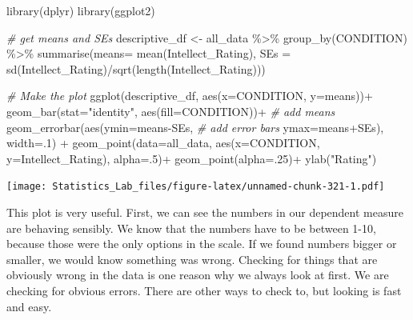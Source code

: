 \documentclass[
]{book}
\newenvironment{Shaded}{\begin{snugshade}}{\end{snugshade}}
\newcommand{\AttributeTok}[1]{\textcolor[rgb]{0.77,0.63,0.00}{#1}}
\newcommand{\CommentTok}[1]{\textcolor[rgb]{0.56,0.35,0.01}{\textit{#1}}}
\newcommand{\DecValTok}[1]{\textcolor[rgb]{0.00,0.00,0.81}{#1}}
\newcommand{\FunctionTok}[1]{\textcolor[rgb]{0.00,0.00,0.00}{#1}}
\newcommand{\NormalTok}[1]{#1}
\newcommand{\OtherTok}[1]{\textcolor[rgb]{0.56,0.35,0.01}{#1}}
\newcommand{\SpecialCharTok}[1]{\textcolor[rgb]{0.00,0.00,0.00}{#1}}
\newcommand{\StringTok}[1]{\textcolor[rgb]{0.31,0.60,0.02}{#1}}
\begin{document}
\begin{Shaded}
\begin{Highlighting}[]
\FunctionTok{library}\NormalTok{(dplyr)}
\FunctionTok{library}\NormalTok{(ggplot2)}

\CommentTok{\# get means and SEs}
\NormalTok{descriptive\_df }\OtherTok{\textless{}{-}}\NormalTok{ all\_data }\SpecialCharTok{\%\textgreater{}\%} 
                    \FunctionTok{group\_by}\NormalTok{(CONDITION) }\SpecialCharTok{\%\textgreater{}\%} 
                    \FunctionTok{summarise}\NormalTok{(}\AttributeTok{means=} \FunctionTok{mean}\NormalTok{(Intellect\_Rating),}
                              \AttributeTok{SEs =} \FunctionTok{sd}\NormalTok{(Intellect\_Rating)}\SpecialCharTok{/}\FunctionTok{sqrt}\NormalTok{(}\FunctionTok{length}\NormalTok{(Intellect\_Rating)))}

\CommentTok{\# Make the plot}
\FunctionTok{ggplot}\NormalTok{(descriptive\_df, }\FunctionTok{aes}\NormalTok{(}\AttributeTok{x=}\NormalTok{CONDITION, }\AttributeTok{y=}\NormalTok{means))}\SpecialCharTok{+} 
  \FunctionTok{geom\_bar}\NormalTok{(}\AttributeTok{stat=}\StringTok{"identity"}\NormalTok{, }\FunctionTok{aes}\NormalTok{(}\AttributeTok{fill=}\NormalTok{CONDITION))}\SpecialCharTok{+} \CommentTok{\# add means}
  \FunctionTok{geom\_errorbar}\NormalTok{(}\FunctionTok{aes}\NormalTok{(}\AttributeTok{ymin=}\NormalTok{means}\SpecialCharTok{{-}}\NormalTok{SEs,               }\CommentTok{\# add error bars}
                    \AttributeTok{ymax=}\NormalTok{means}\SpecialCharTok{+}\NormalTok{SEs), }\AttributeTok{width=}\NormalTok{.}\DecValTok{1}\NormalTok{) }\SpecialCharTok{+}
  \FunctionTok{geom\_point}\NormalTok{(}\AttributeTok{data=}\NormalTok{all\_data, }\FunctionTok{aes}\NormalTok{(}\AttributeTok{x=}\NormalTok{CONDITION, }\AttributeTok{y=}\NormalTok{Intellect\_Rating), }\AttributeTok{alpha=}\NormalTok{.}\DecValTok{5}\NormalTok{)}\SpecialCharTok{+}
  \FunctionTok{geom\_point}\NormalTok{(}\AttributeTok{alpha=}\NormalTok{.}\DecValTok{25}\NormalTok{)}\SpecialCharTok{+}
  \FunctionTok{ylab}\NormalTok{(}\StringTok{"Rating"}\NormalTok{)}
\end{Highlighting}
\end{Shaded}

\texttt{[image: Statistics\_Lab\_files/figure-latex/unnamed-chunk-321-1.pdf]}

This plot is very useful. First, we can see the numbers in our dependent measure are behaving sensibly. We know that the numbers have to be between 1-10, because those were the only options in the scale. If we found numbers bigger or smaller, we would know something was wrong. Checking for things that are obviously wrong in the data is one reason why we always look at first. We are checking for obvious errors. There are other ways to check to, but looking is fast and easy.
\end{document}
